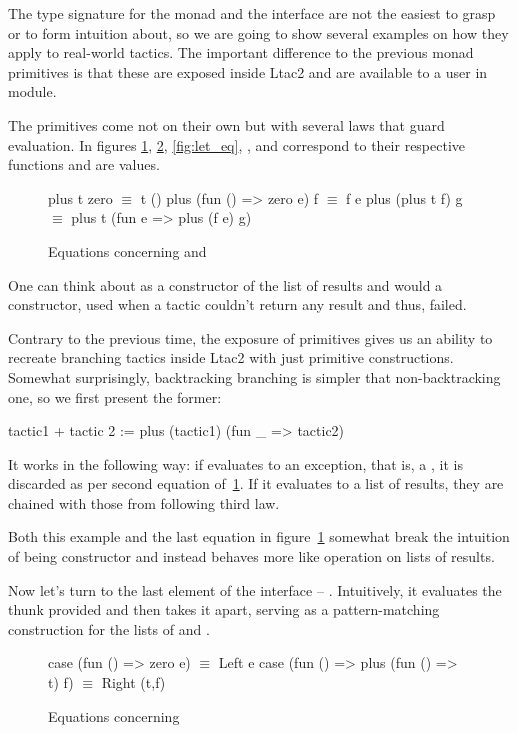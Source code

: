 The type signature for the monad and the interface are not the easiest to grasp or to form intuition about, so we are going to show several examples on how they apply to real-world tactics.
The important difference to the previous monad primitives is that these are exposed inside Ltac2 and are available to a user in  module.

The primitives come not on their own but with several laws that guard evaluation.
In figures \ref{fig:zero_plus_eq}, \ref{fig:case_eq}, \ref{fig:let_eq}, ,  and  correspond to their respective functions and  are values.
\begin{figure}[H]
\begin{coq}
plus t zero $\equiv$ t ()
plus (fun () => zero e) f $\equiv$ f e
plus (plus t f) g $\equiv$ plus t (fun e => plus (f e) g)
\end{coq}
\caption{Equations concerning  and }
\label{fig:zero_plus_eq}
\end{figure}

One can think about  as a  constructor of the list of results and  would a  constructor, used when a tactic couldn't return any result and thus, failed.

Contrary to the previous time, the exposure of primitives gives us an ability to recreate branching tactics inside Ltac2 with just primitive constructions.
Somewhat surprisingly, backtracking branching is simpler that non-backtracking one, so we first present the former:
\begin{coq}
tactic1 + tactic 2 := plus (tactic1) (fun _ => tactic2)
\end{coq}
It works in the following way: if  evaluates to an exception, that is, a , it is discarded as per second equation of~\ref{fig:zero_plus_eq}.
If it evaluates to a list of results, they are chained with those from  following third law.

Both this example and the last equation in figure~\ref{fig:zero_plus_eq} somewhat break the intuition of  being  constructor and instead behaves more like  operation on lists of results.

Now let's turn to the last element of the interface -- .
Intuitively, it evaluates the thunk provided and then takes it apart, serving as a pattern-matching construction for the lists of  and .
\begin{figure}[H]
\begin{coq}
case (fun () => zero e) $\equiv$ Left e
case (fun () => plus (fun () => t) f) $\equiv$ Right (t,f)
\end{coq}
\caption{Equations concerning }
\label{fig:case_eq}
\end{figure}

